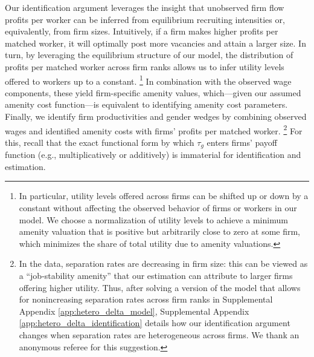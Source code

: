 Our identification argument leverages the insight that unobserved firm flow profits per worker can be inferred from equilibrium recruiting intensities or, equivalently, from firm sizes. Intuitively, if a firm makes higher profits per matched worker, it will optimally post more vacancies and attain a larger size. In turn, by leveraging the equilibrium structure of our model, the distribution of profits per matched worker across firm ranks allows us to infer utility levels offered to workers up to a constant.%
%
\footnote{\label{revision_2:r2_minor_comment_footnote}In particular, utility levels offered across firms can be shifted up or down by a constant without affecting the observed behavior of firms or workers in our model. We choose a normalization of utility levels to achieve a minimum amenity valuation that is positive but arbitrarily close to zero at some firm, which minimizes the share of total utility due to amenity valuations.\label{revision_2:r2_comment_minor}} %
%
In combination with the observed wage components, these yield firm-specific amenity values, which---given our assumed amenity cost function---is equivalent to identifying amenity cost parameters. Finally, we identify firm productivities and gender wedges by combining observed wages and identified amenity costs with firms' profits per matched worker.%
%
\footnote{In the data, separation rates are decreasing in firm size: this can be viewed as a ``job-stability amenity'' that our estimation can attribute to larger firms offering higher utility. Thus, after solving a version of the model that allows for nonincreasing separation rates across firm ranks in Supplemental Appendix \ref{app:hetero_delta_model}, Supplemental Appendix \ref{app:hetero_delta_identification} details how our identification argument changes when separation rates are heterogeneous across firms. We thank an anonymous referee for this suggestion.} %
%
For this, recall that the exact functional form by which $\tau_{g}$ enters firms' payoff function (e.g., multiplicatively or additively) is immaterial for identification and estimation.

